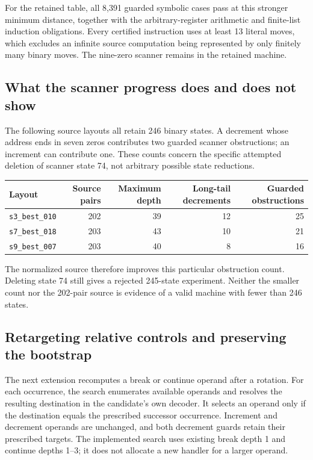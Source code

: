 For the retained table, all 8,391 guarded symbolic cases pass at this
stronger minimum distance, together with the arbitrary-register arithmetic
and finite-list induction obligations.  Every certified instruction uses
at least 13 literal moves, which excludes an infinite source computation
being represented by only finitely many binary moves.  The nine-zero
scanner remains in the retained machine.

\subsection{What the scanner progress does and does not show}

The following source layouts all retain 246 binary states.  A decrement
whose address ends in seven zeros contributes two guarded scanner
obstructions; an increment can contribute one.  These counts concern the
specific attempted deletion of scanner state 74, not arbitrary possible
state reductions.

\begin{center}
\begin{tabular}{@{}lrrrr@{}}
\toprule
Layout & Source pairs & Maximum depth & Long-tail decrements
 & Guarded obstructions\\
\midrule
\texttt{s3\_best\_010} & 202 & 39 & 12 & 25\\
\texttt{s7\_best\_018} & 203 & 43 & 10 & 21\\
\texttt{s9\_best\_007} & 203 & 40 & 8 & 16\\
\bottomrule
\end{tabular}
\end{center}

The normalized source therefore improves this particular obstruction
count.  Deleting state 74 still gives a rejected 245-state experiment.
Neither the smaller count nor the 202-pair source is evidence of a valid
machine with fewer than 246 states.

\subsection{Retargeting relative controls and preserving the bootstrap}

The next extension recomputes a break or continue operand after a rotation.
For each occurrence, the search enumerates available operands and resolves
the resulting destination in the candidate's own decoder.  It selects an
operand only if the destination equals the prescribed successor
occurrence.  Increment and decrement operands are unchanged, and both
decrement guards retain their prescribed targets.  The implemented search
uses existing break depth 1 and continue depths 1--3; it does not allocate
a new handler for a larger operand.

